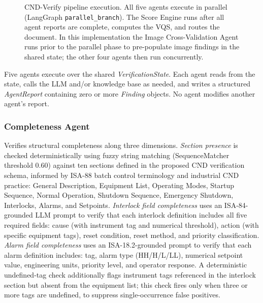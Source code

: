 \documentclass[journal]{IEEEtran}
\begin{document}
\begin{figure}[!t]
\caption{CND-Verify pipeline execution. All five agents execute in parallel
(LangGraph \texttt{parallel\_branch}). The Score Engine runs after all agent
reports are complete, computes the VQS, and routes the document. In this
implementation the Image Cross-Validation Agent runs prior to the parallel phase
to pre-populate image findings in the shared state; the other four agents then
run concurrently.}
\label{fig:pipeline}
\end{figure}

Five agents execute over the shared \textit{VerificationState}. Each agent reads
from the state, calls the LLM and/or knowledge base as needed, and writes a
structured \textit{AgentReport} containing zero or more \textit{Finding}
objects. No agent modifies another agent's report.

\subsubsection{Completeness Agent}
Verifies structural completeness along three dimensions. \textit{Section
presence} is checked deterministically using fuzzy string matching
(SequenceMatcher threshold 0.60) against ten sections defined in the proposed
CND verification schema, informed by ISA-88 batch control terminology and
industrial CND practice: General Description, Equipment List, Operating Modes,
Startup Sequence, Normal Operation, Shutdown Sequence, Emergency Shutdown,
Interlocks, Alarms, and Setpoints.
\textit{Interlock field completeness} uses an ISA-84-grounded LLM prompt to
verify that each interlock definition includes all five required fields: cause
(with instrument tag and numerical threshold), action (with specific equipment
tags), reset condition, reset method, and priority classification.
\textit{Alarm field completeness} uses an ISA-18.2-grounded prompt to verify
that each alarm definition includes: tag, alarm type (HH/H/L/LL), numerical
setpoint value, engineering units, priority level, and operator response. A
deterministic undefined-tag check additionally flags instrument tags referenced
in the interlock section but absent from the equipment list; this check fires
only when three or more tags are undefined, to suppress single-occurrence
false positives.
\end{document}

